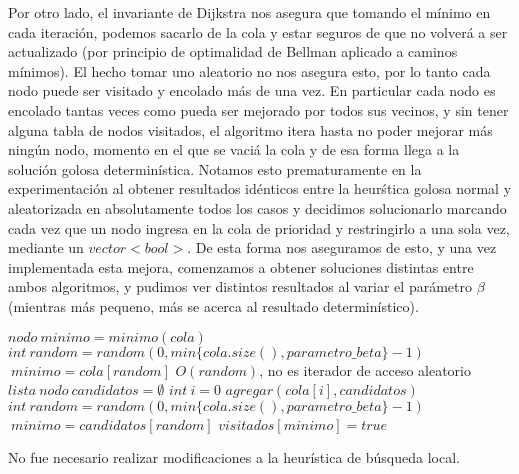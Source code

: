Por otro lado, el invariante de Dijkstra nos asegura que tomando el mínimo en cada iteraci\'on, podemos sacarlo de la cola y estar seguros de que no volver\'a a ser actualizado (por principio de optimalidad de Bellman aplicado a caminos m\'inimos). El hecho tomar uno aleatorio no nos asegura esto, por lo tanto cada nodo puede ser visitado y encolado m\'as de una vez. En particular cada nodo es encolado tantas veces como pueda ser mejorado por todos sus vecinos, y sin tener alguna tabla de nodos visitados, el algoritmo itera hasta no poder mejorar m\'as ning\'un nodo, momento en el que se vaci\'a la cola y de esa forma llega a la soluci\'on golosa determin\'istica. Notamos esto prematuramente en la experimentaci\'on al obtener resultados id\'enticos entre la heur\'stica golosa normal y aleatorizada en absolutamente todos los casos y decidimos solucionarlo marcando cada vez que un nodo ingresa en la cola de prioridad y restringirlo a una sola vez, mediante un $vector<bool>$. De esta forma nos aseguramos de esto, y una vez implementada esta mejora, comenzamos a obtener soluciones distintas entre ambos algoritmos, y pudimos ver distintos resultados al variar el par\'ametro $\beta$ (mientras m\'as pequeno, m\'as se acerca al resultado determin\'istico).

\vspace{2mm}

\begin{algorithmic}

    	 \State $nodo \: minimo = minimo(cola)$    
		\State $int \: random = random(0, min\{cola.size(), parametro\_beta\} -1)$
		\State $ \: minimo = cola[random]$
		\Comment $O(random)$, no es iterador de acceso aleatorio
		\State $lista \: nodo \: candidatos = \emptyset$
		\State $int \: i = 0$
				\State $ agregar(cola[i], candidatos) $
			\EndIf
		\EndWhile
		\State $int \: random = random(0, min\{cola.size(), parametro\_beta\} -1)$
		\State $ \: minimo = candidatos[random]$
		\State $visitados[minimo] = true$
		\EndIf
		
\EndWhile
\end{algorithmic}

\vspace{2mm}

No fue necesario realizar modificaciones a la heur\'istica de b\'usqueda local.


